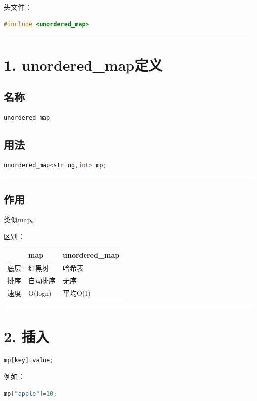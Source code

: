 \documentclass[9pt,twocolumn]{extarticle}
\begin{document}
头文件：
\begin{lstlisting}[language=C++]
#include <unordered_map>
\end{lstlisting}

\noindent\rule{\linewidth}{0.4pt}

\section{1. unordered\_map定义}

\subsection{名称}
\begin{lstlisting}[language=C++]
unordered_map
\end{lstlisting}

\subsection{用法}
\begin{lstlisting}[language=C++]
unordered_map<string,int> mp;
\end{lstlisting}

\noindent\rule{\linewidth}{0.4pt}

\subsection{作用}
类似map。

区别：
\begin{table}[h]
\centering
\begin{tabular}{|l|l|l|}
\hline
 & map & unordered\_map \\ \hline
底层 & 红黑树 & 哈希表 \\ \hline
排序 & 自动排序 & 无序 \\ \hline
速度 & O(logn) & 平均O(1) \\ \hline
\end{tabular}
\end{table}

\noindent\rule{\linewidth}{0.4pt}

\section{2. 插入}
\begin{lstlisting}[language=C++]
mp[key]=value;
\end{lstlisting}
例如：
\begin{lstlisting}[language=C++]
mp["apple"]=10;
\end{lstlisting}
\end{document}
